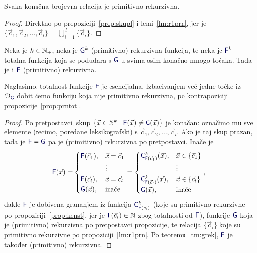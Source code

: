 \begin{korolar}[{name=[primitivna rekurzivnost konačnih relacija]}]\label{kor:konprn}
Svaka konačna brojevna relacija je primitivno rekurzivna.
\end{korolar}
\begin{proof}
Direktno po propoziciji~\ref{prop:skupl} i lemi~\ref{lm:r1prn}, jer je $\{\vec c_1,\vec c_2,\dotsc,\vec c_l\}=\bigcup_{i=1}^{\,l}\{\vec c_i\}$.
\end{proof}

\begin{propozicija}[{name=[{teorem o editiranju za totalne funkcije}]}]\label{prop:konprom}
Neka je $k\in{\mathbb N}_+$, neka je $\f G^k$ (primitivno) rekurzivna funkcija, te neka je $\f F^k$ totalna funkcija koja se podudara s $\f G$ u svima osim konačno mnogo točaka. Tada je i $\f F$ (primitivno) rekurzivna.
\end{propozicija}
Naglasimo, totalnost funkcije $\f F$ je esencijalna. Izbacivanjem već jedne točke iz $\dom{\f G}$ dobit ćemo funkciju koja nije primitivno rekurzivna, po kontrapoziciji propozicije~\ref{prop:prntot}.
\begin{proof}
    Po pretpostavci, skup $\{\vec x\in\N^k\mid\f F(\vec x)\ne\f G(\vec x)\}$ je konačan: označimo mu sve elemente (recimo, poredane leksikografski) s $\vec c_1,\vec c_2,\dotsc,\vec c_l$. Ako je taj skup prazan, tada je $\f F=\f G$ pa je (primitivno) rekurzivna po pretpostavci. Inače je
\begin{equation}
    \f F(\vec x)=\begin{cases}
    \f F(\vec c_1),&\vec x=\vec c_1\\
    &\vdots\\
    \f F(\vec c_l),&\vec x=\vec c_l\\
    \f G(\vec x),&\text{inače}
    \end{cases}=\begin{cases}
    \f C^k_{\f F(\vec c_1)}(\vec x),&\vec x\in\{\vec c_1\}\\
    &\vdots\\
    \f C^k_{\f F(\vec c_l)}(\vec x),&\vec x\in\{\vec c_l\}\\
    \f G(\vec x),&\text{inače}
    \end{cases}\text,
\end{equation}
dakle $\f F$ je dobivena grananjem iz funkcija $\f C^k_{\f F(\vec c_i)}$ (koje su primitivno rekurzivne po propoziciji~\ref{prop:konst}, jer je $\f F(\vec c_i)\in\N$ zbog totalnosti od $\f F$), funkcije $\f G$ koja je (primitivno) rekurzivna po pretpostavci propozicije, te relacija $\{\vec c_i\}$ koje su primitivno rekurzivne po propoziciji~\ref{lm:r1prn}. Po teoremu~\ref{tm:grek}, $\f F$ je također (primitivno) rekurzivna.
\end{proof}

